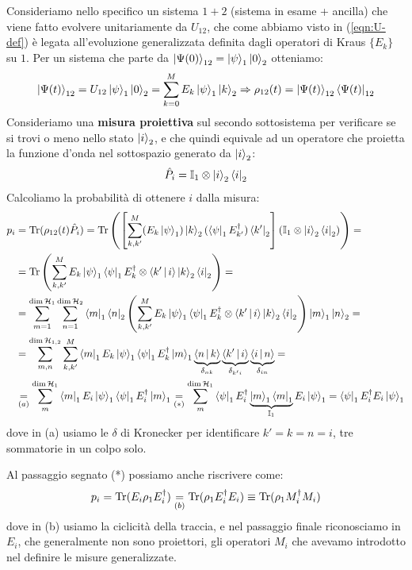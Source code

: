 \documentclass[../../InformazioneQuantistica.tex]{subfiles}
\begin{document}
Consideriamo nello specifico un sistema $1+2$ (sistema in esame + ancilla) che viene fatto evolvere unitariamente da $U_{12}$, che come abbiamo visto in (\ref{eqn:U-def}) è legata all'evoluzione generalizzata definita dagli operatori di Kraus $\{E_k\}$ su $1$. Per un sistema che parte da $\Ket{\Psi(0)}_{12}=\Ket{\psi}_1\Ket{0}_2$ otteniamo:
\begin{align*}
\Ket{\Psi(t)}_{12}=U_{12}\Ket{\psi}_1 \Ket{0}_2 = \sum_{k=0}^M E_k \Ket{\psi}_1 \Ket{k}_2 \Rightarrow \rho_{12}(t)=\Ket{\Psi(t)}_{12}\Bra{\Psi(t)}_{12}
\end{align*}
Consideriamo una \textbf{misura proiettiva} sul secondo sottosistema per verificare se si trovi o meno nello stato $\Ket{i}_2$, e che quindi equivale ad un operatore che proietta la funzione d'onda nel sottospazio generato da $\Ket{i}_2$:
\begin{align*}
\hat{P}_i = \mathbb{I}_1 \otimes \Ket{i}_2\Bra{i}_2
\end{align*}
Calcoliamo la probabilità di ottenere $i$ dalla misura: %
\begin{align*}
p_i &= \operatorname{Tr}(\rho_{12}(t)\hat{P}_i) = \operatorname{Tr}\left( \left[\sum_{k,k'}^M
(E_k\Ket{\psi}_1) \Ket{k}_2 (\Bra{\psi}_1 E_{k'}^\dag) \Bra{k'}_2\right](\mathbb{I}_1 \otimes \Ket{i}_2\Bra{i}_2)\right) =\\
&= \operatorname{Tr}\left( \sum_{k,k'}^M E_k \Ket{\psi}_1 \Bra{\psi}_1 E_k^\dag \otimes {\Braket{k'|i}}\Ket{k}_2 \Bra{i}_2\right) =\\
&=\sum_{m=1}^{\operatorname{dim}\mathcal{H}_1} \sum_{n=1}^{\operatorname{dim}\mathcal{H}_2} \Bra{m}_1 \Bra{n}_2 \left( \sum_{k,k'}^M E_k \Ket{\psi}_1 \Bra{\psi}_1 E_k^\dag \otimes {\Braket{k'|i}}\Ket{k}_2 \Bra{i}_2\right) \Ket{m}_1 \Ket{n}_2 = \\
&= \sum_{m,n}^{\operatorname{dim}\mathcal{H}_{1,2}} \sum_{k,k'}^M \Bra{m}_1 E_k \Ket{\psi}_1 \Bra{\psi}_1 E_k^\dag \Ket{m}_1 \underbrace{\Braket{n|k}}_{\delta_{nk}}\underbrace{\Braket{k'|i}}_{\delta_{k'i}}\underbrace{\Braket{i|n}}_{\delta_{in}} = \\
&\underset{(a)}{=} \sum_{m}^{\operatorname{dim}\mathcal{H}_1} \Bra{m}_1 E_i \Ket{\psi}_1 \Bra{\psi}_1 E_i^\dag \Ket{m}_1 \underset{(*)}{=} \sum_{m}^{\operatorname{dim}\mathcal{H}_1} \Bra{\psi}_1 E_i^\dag \underbrace{\Ket{m}_1 \Bra{m}_1}_{\mathbb{I}_1} E_i \Ket{\psi}_1 = \Bra{\psi}_1 E_i^\dag E_i \Ket{\psi}_1
\end{align*}
dove in (a) usiamo le $\delta$ di Kronecker per identificare $k'=k=n=i$,  tre sommatorie in un colpo solo.

Al passaggio segnato (*) possiamo anche riscrivere come:
\begin{align*}
p_i = \operatorname{Tr}(E_i \rho_1 E_i^\dag) \underset{(b)}{=} \operatorname{Tr}(\rho_1 E_i^\dag E_i) \equiv \operatorname{Tr}(\rho_1 M_i^\dag M_i)      
\end{align*}
dove in (b) usiamo la ciclicità della traccia, e nel passaggio finale riconosciamo in $E_i$, che generalmente non sono proiettori, gli operatori $M_i$ che avevamo introdotto nel definire le misure generalizzate.\\
\end{document}
